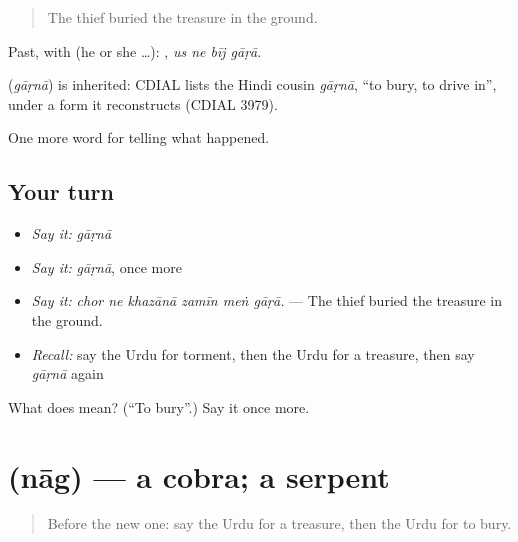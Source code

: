 \begin{quote}
The thief buried the treasure in the ground.
\end{quote}

Past, with  (he or she …):    , \emph{us ne bīj gāṛā}.

\begin{cousinweb}
\textbf{} (\emph{gāṛnā}) is inherited: CDIAL lists the Hindi cousin \emph{gāṛnā}, \textquotedblleft{}to bury, to drive in\textquotedblright{}, under a form it reconstructs (CDIAL 3979).
\end{cousinweb}

\begin{grammarlens}[title={What you've built}]
One more word for telling what happened.
\end{grammarlens}

\subsection*{Your turn}
\begin{itemize}
\raggedright
  \item \emph{Say it:} \emph{gāṛnā}
  \item \emph{Say it:} \emph{gāṛnā}, once more
  \item \emph{Say it:} \emph{chor ne khazānā zamīn meṅ gāṛā.} — The thief buried the treasure in the ground.
  \item \emph{Recall:} say the Urdu for torment, then the Urdu for a treasure, then say \emph{gāṛnā} again
\end{itemize}

\begin{tcolorbox}[breakable,colback=teal!4,colframe=teal!35!black,title={Before you move on}]
What does  mean? (\textquotedblleft{}To bury\textquotedblright{}.) Say it once more.
\end{tcolorbox}
\section[\texorpdfstring{\ur{ناگ} (nāg)}{ناگ (nāg)}]{ (nāg) — a cobra; a serpent}

\label{lesson:UR-C327-nag}



\begin{quote}
Before the new one: say the Urdu for a treasure, then the Urdu for to bury.
\end{quote}

